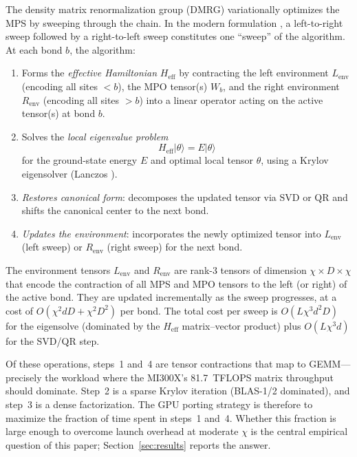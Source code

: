 \documentclass[preprint,12pt]{elsarticle}
\begin{document}
The density matrix renormalization group (DMRG) \cite{White1992,White1993} variationally optimizes the MPS by sweeping through the chain.
In the modern formulation \cite{Schollwoeck2011}, a left-to-right sweep followed by a right-to-left sweep constitutes one ``sweep'' of the algorithm.
At each bond $b$, the algorithm:
\begin{enumerate}
  \item Forms the \emph{effective Hamiltonian} $H_\text{eff}$ by contracting the left environment $L_\text{env}$ (encoding all sites $< b$), the MPO tensor(s) $W_b$, and the right environment $R_\text{env}$ (encoding all sites $> b$) into a linear operator acting on the active tensor(s) at bond $b$.
  \item Solves the \emph{local eigenvalue problem}
  \begin{equation}
    H_\text{eff} |\theta\rangle = E |\theta\rangle
    \label{eq:local_eigenproblem}
  \end{equation}
  for the ground-state energy $E$ and optimal local tensor $\theta$, using a Krylov eigensolver (Lanczos \cite{Lanczos1950}).
  \item \emph{Restores canonical form}: decomposes the updated tensor via SVD or QR and shifts the canonical center to the next bond.
  \item \emph{Updates the environment}: incorporates the newly optimized tensor into $L_\text{env}$ (left sweep) or $R_\text{env}$ (right sweep) for the next bond.
\end{enumerate}

The environment tensors $L_\text{env}$ and $R_\text{env}$ are rank-3 tensors of dimension $\chi \times D \times \chi$ that encode the contraction of all MPS and MPO tensors to the left (or right) of the active bond.
They are updated incrementally as the sweep progresses, at a cost of $O(\chi^2 d D + \chi^2 D^2)$ per bond.
The total cost per sweep is $O(L \chi^3 d^2 D)$ for the eigensolve (dominated by the $H_\text{eff}$ matrix--vector product) plus $O(L \chi^3 d)$ for the SVD/QR step.

Of these operations, steps~1 and~4 are tensor contractions that map to GEMM---precisely the workload where the MI300X's 81.7~TFLOPS matrix throughput should dominate.
Step~2 is a sparse Krylov iteration (BLAS-1/2 dominated), and step~3 is a dense factorization.
The GPU porting strategy is therefore to maximize the fraction of time spent in steps~1 and~4.
Whether this fraction is large enough to overcome launch overhead at moderate $\chi$ is the central empirical question of this paper; Section~\ref{sec:results} reports the answer.
\end{document}
